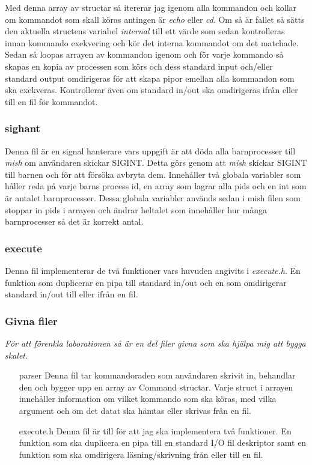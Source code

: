\documentclass[11pt, titlepage, oneside, a4paper]{article}
\begin{document}
		Med denna array av structar så itererar jag igenom alla kommandon och kollar om kommandot som skall köras antingen är \emph{echo} eller \emph{cd}.
		Om så är fallet så sätts den aktuella structens variabel \emph{internal} till ett värde som sedan kontrolleras innan kommando exekvering och kör det
		interna kommandot om det matchade. 
		Sedan så loopas arrayen av kommandon igenom och för varje kommando så skapas en kopia av processen som körs och dess standard input och/eller standard 
		output  omdirigeras för att skapa pipor emellan alla kommandon som ska exekveras. Kontrollerar även om standard in/out ska omdirigeras ifrån eller till
		en fil för kommandot.
		
		
		
		\subsubsection{sighant}
		Denna fil är en signal hanterare vars uppgift är att döda alla barnprocesser till \emph{mish}  om användaren skickar SIGINT. 
		Detta görs genom att \emph{mish} skickar SIGINT till barnen och för att försöka avbryta dem. Innehåller två globala variabler som håller reda på varje barns process id, en array som lagrar alla pids 
		och en int som är antalet barnprocesser. Dessa globala variabler används sedan i mish filen som stoppar in pids i arrayen och ändrar heltalet som innehåller hur många barnprocesser så det är korrekt antal.
		\subsubsection{execute}
		Denna fil implementerar de två funktioner vars huvuden angivits i \emph{execute.h}. En funktion som duplicerar en pipa till standard in/out och en som 
		omdirigerar standard in/out till eller ifrån en fil.
		\subsubsection{Givna filer}
		\emph{För att förenkla laborationen så är en del filer givna som ska hjälpa mig att bygga skalet.} 
		
		\begin{itemize}
		 \item[parser] Denna fil tar kommandoraden som användaren skrivit in, behandlar den och bygger upp en array av Command structar.
		 Varje struct i arrayen innehåller information om vilket kommando som ska köras, med vilka argument och om det datat ska hämtas eller 
		 skrivas från en fil.
		 \item[execute.h] Denna fil är till för att jag ska implementera två funktioner. En funktion som ska duplicera en pipa till en standard I/O fil deskriptor samt en funktion som
		 ska omdirigera läsning/skrivning från eller till en fil.
		\end{itemize}
		\newpage
		
\end{document}
